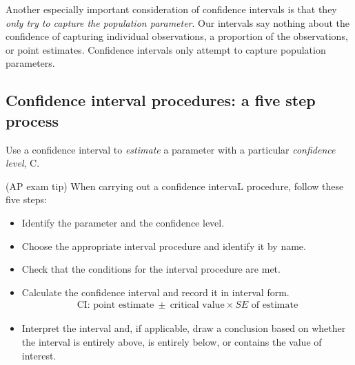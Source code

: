 Another especially important consideration of confidence intervals is that they \emph{only try to capture the population parameter}. Our intervals say nothing about the confidence of capturing individual observations, a proportion of the observations, or point estimates. Confidence intervals only attempt to capture population parameters.



\subsection{Confidence interval procedures: a five step process}

Use a confidence interval to \emph{estimate} a parameter with a particular \emph{confidence level}, C.

\begin{onebox}{(AP exam tip) When carrying out a confidence intervaL procedure, follow these five steps:}
\begin{itemize}
\setlength{\itemsep}{0mm}
\item {}  Identify the parameter and the confidence level.
\item  {}  Choose the appropriate interval procedure and identify it by name.
\item  {}  Check that the conditions for the interval procedure are met. 
\item {} Calculate the confidence interval and record it in interval form.  
\begin{align*}
\text{CI:  point estimate}\ \pm\  \text{critical value}\times SE \text{ of estimate}
\end{align*}
\item {} Interpret the interval and, if applicable, draw a conclusion based on whether the interval is entirely above, is entirely below, or contains the value of interest.
\end{itemize}\end{onebox}



\D{\newpage}

